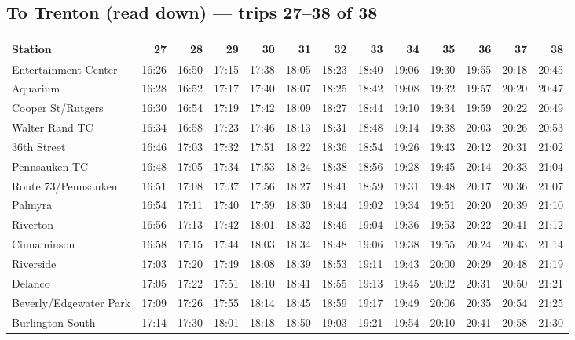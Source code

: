 \subsection*{To Trenton (read down) --- trips 27--38 of 38}
\begin{center}\footnotesize\setlength{\tabcolsep}{3pt}\begin{tabular}{@{}lrrrrrrrrrrrr@{}}\toprule
Station & 27 & 28 & 29 & 30 & 31 & 32 & 33 & 34 & 35 & 36 & 37 & 38 \\\midrule
Entertainment Center & 16:26 & 16:50 & 17:15 & 17:38 & 18:05 & 18:23 & 18:40 & 19:06 & 19:30 & 19:55 & 20:18 & 20:45 \\
Aquarium & 16:28 & 16:52 & 17:17 & 17:40 & 18:07 & 18:25 & 18:42 & 19:08 & 19:32 & 19:57 & 20:20 & 20:47 \\
Cooper St/Rutgers & 16:30 & 16:54 & 17:19 & 17:42 & 18:09 & 18:27 & 18:44 & 19:10 & 19:34 & 19:59 & 20:22 & 20:49 \\
Walter Rand TC & 16:34 & 16:58 & 17:23 & 17:46 & 18:13 & 18:31 & 18:48 & 19:14 & 19:38 & 20:03 & 20:26 & 20:53 \\
36th Street & 16:46 & 17:03 & 17:32 & 17:51 & 18:22 & 18:36 & 18:54 & 19:26 & 19:43 & 20:12 & 20:31 & 21:02 \\
Pennsauken TC & 16:48 & 17:05 & 17:34 & 17:53 & 18:24 & 18:38 & 18:56 & 19:28 & 19:45 & 20:14 & 20:33 & 21:04 \\
Route 73/Pennsauken & 16:51 & 17:08 & 17:37 & 17:56 & 18:27 & 18:41 & 18:59 & 19:31 & 19:48 & 20:17 & 20:36 & 21:07 \\
Palmyra & 16:54 & 17:11 & 17:40 & 17:59 & 18:30 & 18:44 & 19:02 & 19:34 & 19:51 & 20:20 & 20:39 & 21:10 \\
Riverton & 16:56 & 17:13 & 17:42 & 18:01 & 18:32 & 18:46 & 19:04 & 19:36 & 19:53 & 20:22 & 20:41 & 21:12 \\
Cinnaminson & 16:58 & 17:15 & 17:44 & 18:03 & 18:34 & 18:48 & 19:06 & 19:38 & 19:55 & 20:24 & 20:43 & 21:14 \\
Riverside & 17:03 & 17:20 & 17:49 & 18:08 & 18:39 & 18:53 & 19:11 & 19:43 & 20:00 & 20:29 & 20:48 & 21:19 \\
Delanco & 17:05 & 17:22 & 17:51 & 18:10 & 18:41 & 18:55 & 19:13 & 19:45 & 20:02 & 20:31 & 20:50 & 21:21 \\
Beverly/Edgewater Park & 17:09 & 17:26 & 17:55 & 18:14 & 18:45 & 18:59 & 19:17 & 19:49 & 20:06 & 20:35 & 20:54 & 21:25 \\
Burlington South & 17:14 & 17:30 & 18:01 & 18:18 & 18:50 & 19:03 & 19:21 & 19:54 & 20:10 & 20:41 & 20:58 & 21:30 \\

\end{tabular}
\end{center}
